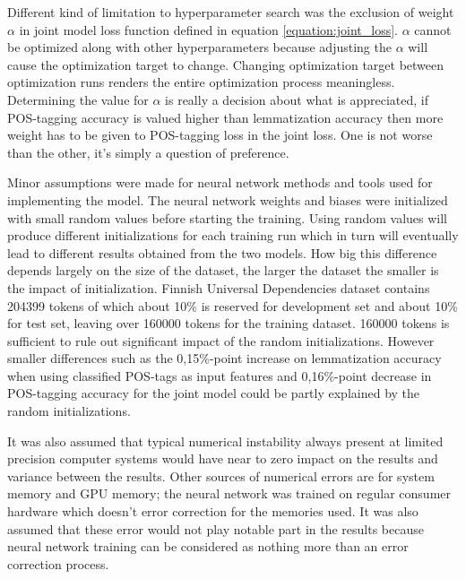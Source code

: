 \documentclass[12pt,a4paper,english
]{tutthesis}
\begin{document}
Different kind of limitation to hyperparameter search was the exclusion of weight $\alpha$ in joint model loss function defined in equation \ref{equation:joint_loss}. $\alpha$ cannot be optimized along with other hyperparameters because adjusting the $\alpha$ will cause the optimization target to change. Changing optimization target between optimization runs renders the entire optimization process meaningless. Determining the value for $\alpha$ is really a decision about what is appreciated, if POS-tagging accuracy is valued higher than lemmatization accuracy then more weight has to be given to POS-tagging loss in the joint loss. One is not worse than the other, it's simply a question of preference.

Minor assumptions were made for neural network methods and tools used for implementing the model. The neural network weights and biases were initialized with small random values before starting the training. Using random values will produce different initializations for each training run which in turn will eventually lead to different results obtained from the two models. How big this difference depends largely on the size of the dataset, the larger the dataset the smaller is the impact of initialization. Finnish Universal Dependencies dataset contains 204399 tokens of which about 10\% is reserved for development set and about 10\% for test set, leaving over 160000 tokens for the training dataset. 160000 tokens is sufficient to rule out significant impact of the random initializations. However smaller differences such as the 0,15\%-point increase on lemmatization accuracy when using classified POS-tags as input features and 0,16\%-point decrease in POS-tagging accuracy for the joint model could be partly explained by the random initializations.

It was also assumed that typical numerical instability always present at limited precision computer systems would have near to zero impact on the results and variance between the results. Other sources of numerical errors are for system memory and GPU memory; the neural network was trained on regular consumer hardware which doesn't error correction for the memories used. It was also assumed that these error would not play notable part in the results because neural network training can be considered as nothing more than an error correction process.
\end{document}
